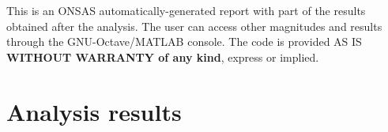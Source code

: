 \documentclass[a4paper,10pt]{article}
\begin{document}
 
This is an ONSAS automatically-generated report with part of the results obtained after the analysis. The user can access other magnitudes and results through the GNU-Octave/MATLAB console. The code is provided AS IS \textbf{WITHOUT WARRANTY of any kind}, express or implied.

\section{Analysis results}

\begin{longtable}{cccccc} 
 
\end{longtable}
\end{document}
